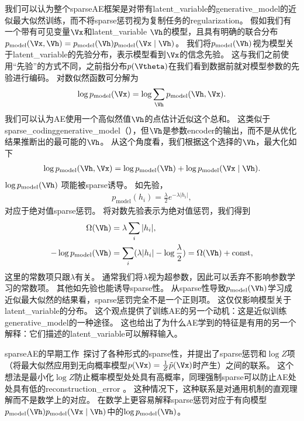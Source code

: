 
我们可以认为整个\gls{sparse}\gls{AE}框架是对带有\gls{latent_variable}的\gls{generative_model}的近似最大似然训练，而不将\gls{sparse}惩罚视为复制任务的\gls{regularization}。
假如我们有一个带有可见变量$\Vx$和\gls{latent_variable} $\Vh$的模型，且具有明确的联合分布$p_{\text{model}}(\Vx,\Vh)=p_{\text{model}}(\Vh)p_{\text{model}} (\Vx \mid \Vh)$。
我们将$p_{\text{model}}(\Vh)$视为模型关于\gls{latent_variable}的先验分布，表示模型看到$\Vx$的信念先验。
这与我们之前使用``先验''的方式不同，之前指分布$p(\Vtheta)$在我们看到数据前就对模型参数的先验进行编码。
对数似然函数可分解为
\begin{align}
\log p_{\text{model}}(\Vx)=\log \sum_{\Vh} p_{\text{model}}(\Vh, \Vx) .
\end{align}
我们可以认为\gls{AE}使用一个高似然值$\Vh$的点估计近似这个总和。
这类似于\gls{sparse_coding}\gls{generative_model}（），但$\Vh$是参数\gls{encoder}的输出，而不是从优化结果推断出的最可能的$\Vh$。
从这个角度看，我们根据这个选择的$\Vh$，最大化如下
\begin{align}
\log p_{\text{model}}(\Vh, \Vx)=\log p_{\text{model}}(\Vh) + \log p_{\text{model}}(\Vx \mid \Vh) .
\end{align}
$\log p_{\text{model}}(\Vh) $ 项能被\gls{sparse}诱导。
如先验，
\begin{align}
p_{\text{model}}(h_i) = \frac{\lambda}{2} e^{-\lambda | h_i |},
\end{align}
对应于绝对值\gls{sparse}惩罚。
将对数先验表示为绝对值惩罚，我们得到
\begin{align}
\Omega(\Vh) &= \lambda \sum_{i} | h_i  |,\\ 
-\log p_{\text{model}}(\Vh) &= 
\sum_i (\lambda | h_i | - \log \frac{\lambda}{2}) = \Omega(\Vh) + \text{const},
\end{align}
这里的常数项只跟$\lambda$有关。
通常我们将$\lambda$视为超参数，因此可以丢弃不影响参数学习的常数项。
其他如先验也能诱导\gls{sparse}性。
从\gls{sparse}性导致$p_{\text{model}}(\Vh)$学习成近似最大似然的结果看，\gls{sparse}惩罚完全不是一个正则项。
这仅仅影响模型关于\gls{latent_variable}的分布。
这个观点提供了训练\gls{AE}的另一个动机：这是近似训练\gls{generative_model}的一种途径。
这也给出了为什么\gls{AE}学到的特征是有用的另一个解释：它们描述的\gls{latent_variable}可以解释输入。


\gls{sparse}\gls{AE}的早期工作~\citep{ranzato-07-small,ranzato-08-small}探讨了各种形式的\gls{sparse}性，并提出了\gls{sparse}惩罚和$\log  Z$项（将最大似然应用到无向概率模型$p(\Vx)=\frac{1}{Z}\tilde{p}(\Vx)$时产生）之间的联系。
这个想法是最小化$\log Z$防止概率模型处处具有高概率，同理强制\gls{sparse}可以防止\gls{AE}处处具有低的\gls{reconstruction_error} 。
这种情况下，这种联系是对通用机制的直观理解而不是数学上的对应。
在数学上更容易解释\gls{sparse}惩罚对应于有向模型$p_{\text{model}}(\Vh)p_{\text{model}}(\Vx \mid \Vh) $中的$\log p_{\text{model}}(\Vh)$。



